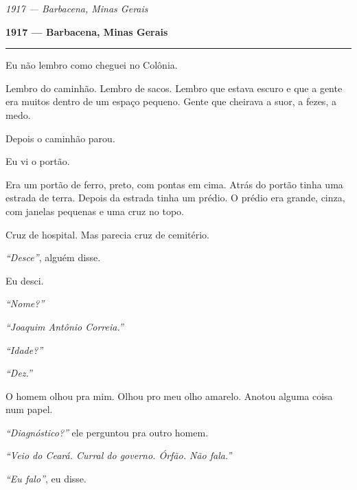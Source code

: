 
\noindent \textit{1917 --- Barbacena, Minas Gerais}

\noindent \textbf{1917 --- Barbacena, Minas Gerais}

\vspace{0.5em}\noindent\rule{\textwidth}{0.5pt}\vspace{0.5em}

\noindent Eu não lembro como cheguei no Colônia.

\noindent Lembro do caminhão. Lembro de sacos. Lembro que estava escuro e que a gente era muitos dentro de um espaço pequeno. Gente que cheirava a suor, a fezes, a medo.

\noindent Depois o caminhão parou.

\noindent Eu vi o portão.

\noindent Era um portão de ferro, preto, com pontas em cima. Atrás do portão tinha uma estrada de terra. Depois da estrada tinha um prédio. O prédio era grande, cinza, com janelas pequenas e uma cruz no topo.

\noindent Cruz de hospital. Mas parecia cruz de cemitério.

\noindent \textit{\textquotedblleft{}Desce\textquotedblright{}}, alguém disse.

\noindent Eu desci.

\noindent \textit{\textquotedblleft{}Nome?\textquotedblright{}}

\noindent \textit{\textquotedblleft{}Joaquim Antônio Correia.\textquotedblright{}}

\noindent \textit{\textquotedblleft{}Idade?\textquotedblright{}}

\noindent \textit{\textquotedblleft{}Dez.\textquotedblright{}}

\noindent O homem olhou pra mim. Olhou pro meu olho amarelo. Anotou alguma coisa num papel.

\noindent \textit{\textquotedblleft{}Diagnóstico?\textquotedblright{}} ele perguntou pra outro homem.

\noindent \textit{\textquotedblleft{}Veio do Ceará. Curral do governo. Órfão. Não fala.\textquotedblright{}}

\noindent \textit{\textquotedblleft{}Eu falo\textquotedblright{}}, eu disse.

